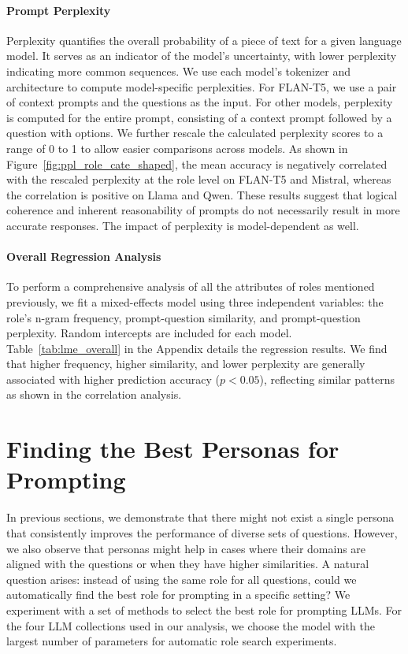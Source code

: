 \documentclass[11pt]{article}
\newcommand{\tref}[1]{Table~\ref{#1}}
\begin{document}
\paragraph{Prompt Perplexity}

Perplexity quantifies the overall probability of a piece of text for a given language model. It serves as an indicator of the model's uncertainty, with lower perplexity indicating more common sequences. We use each model's tokenizer and architecture to compute model-specific perplexities. For FLAN-T5, we use a pair of context prompts and the questions as the input. For other models, perplexity is computed for the entire prompt, consisting of a context prompt followed by a question with options.  We further rescale the calculated perplexity scores to a range of 0 to 1 to allow easier comparisons across models. As shown in Figure~\ref{fig:ppl_role_cate_shaped}, the mean accuracy is negatively correlated with the rescaled perplexity at the role level on FLAN-T5 and Mistral, whereas the correlation is positive on Llama and Qwen. These results suggest that logical coherence and inherent reasonability of prompts do not necessarily result in more accurate responses. The impact of perplexity is model-dependent as well. 

\paragraph{Overall Regression Analysis} To perform a comprehensive analysis of all the attributes of roles mentioned previously, we fit a mixed-effects model using three independent variables: the role's n-gram frequency, prompt-question similarity, and prompt-question perplexity. Random intercepts are included for each model. \tref{tab:lme_overall} in the Appendix details the regression results. We find that higher frequency, higher similarity, and lower perplexity are generally associated with higher prediction accuracy ($p < 0.05$), reflecting similar patterns as shown in the correlation analysis. 


\section{Finding the Best Personas for Prompting}

In previous sections, we demonstrate that there might not exist a single persona that consistently improves the performance of diverse sets of questions. However, we also observe that personas might help in cases where their domains are aligned with the questions or when they have higher similarities.  A natural question arises: instead of using the same role for all questions, could we automatically find the best role for prompting in a specific setting? We experiment with a set of methods to select the best role for prompting LLMs. For the four LLM collections used in our analysis, we choose the model with the largest number of parameters for automatic role search experiments. 
\end{document}

